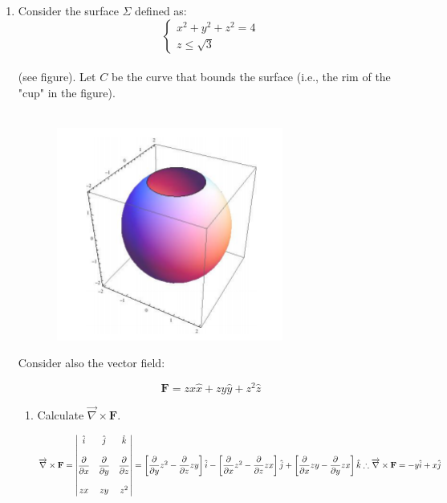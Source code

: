 \documentclass[fleqn]{article}
\begin{document}
  \begin{enumerate}
    \item Consider the surface $\Sigma$ defined as: \\
      $$\begin{cases}
        x^2+y^2+z^2=4 \\
        z \leq \sqrt{3}
      \end{cases}$$ \\
      (see figure). Let $C$ be the curve that bounds the surface (i.e., the rim of the "cup" in the figure). \\
      \\
      \begin{center}
        \includegraphics[height=7cm, width=10cm]{first.png}
      \end{center}

      Consider also the vector field:

      $$\mathbf{F}=zx \hat{x}+zy \hat{y}+z^2 \hat{z}$$
      \begin{enumerate}
        \item Calculate $\overrightarrow{\nabla} \times \mathbf{F}$.

          \textcolor{hwColor}{
            $
              \overrightarrow{\nabla} \times \mathbf{F}=\begin{vmatrix}
                \hat{i} & \hat{j} & \hat{k} \\
                \\
                \dfrac{\partial}{\partial x} & \dfrac{\partial}{\partial y} & \dfrac{\partial}{\partial z} \\
                \\
                zx & zy & z^2
              \end{vmatrix}=\left[\dfrac{\partial}{\partial y}z^2-\dfrac{\partial}{\partial z}zy\right]\hat{i}-\left[\dfrac{\partial}{\partial x}z^2-\dfrac{\partial}{\partial z}zx\right]\hat{j}+\left[\dfrac{\partial}{\partial x} zy-\dfrac{\partial}{\partial y}zx\right]\hat{k} \\
              \\
              \\
              \therefore \overrightarrow{\nabla} \times \mathbf{F}=-y \hat{i}+x\hat{j}
            $
          }


\end{enumerate}
\end{enumerate}
\end{document}
